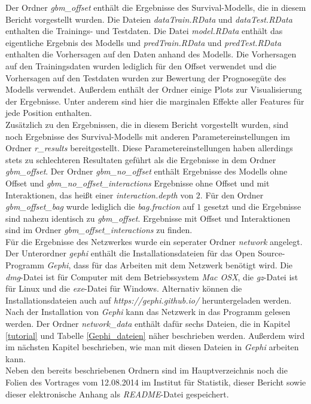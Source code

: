 \noindent Der Ordner \textit{gbm\_offset} enthält die Ergebnisse des Survival-Modells, die in diesem Bericht vorgestellt wurden. Die Dateien \textit{dataTrain.RData} und \textit{dataTest.RData} enthalten die Trainings- und Testdaten. Die Datei \textit{model.RData} enthält das eigentliche Ergebnis des Modells und \textit{predTrain.RData} und \textit{predTest.RData} enthalten die Vorhersagen auf den Daten anhand des Modells. Die Vorhersagen auf den Trainingsdaten wurden lediglich für den Offset verwendet und die Vorhersagen auf den Testdaten wurden zur Bewertung der Prognosegüte des Modells verwendet. Außerdem enthält der Ordner einige Plots zur Visualisierung der Ergebnisse. Unter anderem sind hier die marginalen Effekte aller Features für jede Position enthalten.\\
Zusätzlich zu den Ergebnissen, die in diesem Bericht vorgestellt wurden, sind noch Ergebnisse des Survival-Modells mit anderen Parametereinstellungen im Ordner \textit{r\_results} bereitgestellt. Diese Parametereinstellungen haben allerdings stets zu schlechteren Resultaten geführt als die Ergebnisse in dem Ordner \textit{gbm\_offset}. Der Ordner \textit{gbm\_no\_offset} enthält Ergebnisse des Modells ohne Offset und \textit{gbm\_no\_offset\_interactions} Ergebnisse ohne Offset und mit Interaktionen, das heißt einer \textit{interaction.depth} von $2$. Für den Ordner \textit{gbm\_offset\_bag} wurde lediglich die \textit{bag.fraction} auf $1$ gesetzt und die Ergebnisse sind nahezu identisch zu \textit{gbm\_offset}. Ergebnisse mit Offset und Interaktionen sind im Ordner \textit{gbm\_offset\_interactions} zu finden.\\
Für die Ergebnisse des Netzwerkes wurde ein seperater Ordner \textit{network} angelegt. Der Unterordner \textit{gephi} enthält die Installationsdateien für das Open Source-Programm \textit{Gephi}, dass für das Arbeiten mit dem Netzwerk benötigt wird. Die \textit{dmg}-Datei ist für Computer mit dem Betriebssystem \textit{Mac OSX}, die \textit{gz}-Datei ist für Linux und die \textit{exe}-Datei für Windows. Alternativ können die Installationsdateien auch auf \textit{https://gephi.github.io/} heruntergeladen werden.\\
Nach der Installation von \textit{Gephi} kann das Netzwerk in das Programm gelesen werden. Der Ordner \textit{network\_data} enthält dafür sechs Dateien, die in Kapitel \ref{tutorial} und Tabelle \ref{Gephi_dateien} näher beschrieben werden. Außerdem wird im nächsten Kapitel beschrieben, wie man mit diesen Dateien in \textit{Gephi} arbeiten kann.\\
Neben den bereits beschriebenen Ordnern sind im Hauptverzeichnis noch die Folien des Vortrages vom 12.08.2014 im Institut für Statistik, dieser Bericht sowie dieser elektronische Anhang als \textit{README}-Datei gespeichert.
